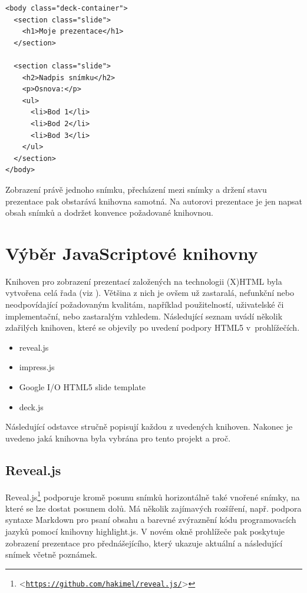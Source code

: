 \documentclass[11pt,twoside,a4paper]{book}
\let\oldUrl\url									%
\renewcommand\url[1]{<\texttt{\oldUrl{#1}}>}
\begin{document}
\begin{lstlisting}[caption=Ukázka zdrojového kódu HTML prezentace (deck.js)]
<body class="deck-container">
  <section class="slide">
    <h1>Moje prezentace</h1>
  </section>

  <section class="slide">
    <h2>Nadpis snímku</h2>
    <p>Osnova:</p>
    <ul>
      <li>Bod 1</li>
      <li>Bod 2</li>
      <li>Bod 3</li>
    </ul>
  </section>
</body>
\end{lstlisting}

Zobrazení právě jednoho snímku, přecházení mezi snímky a držení stavu prezentace pak obstarává knihovna samotná. Na autorovi prezentace je jen napsat obsah snímků a dodržet konvence požadované knihovnou.


\section{Výběr JavaScriptové knihovny}
Knihoven pro zobrazení prezentací založených na technologii (X)HTML byla vytvořena celá řada (viz \cite{htmlslideshowweb}). Většina z nich je ovšem už zastaralá, nefunkční nebo neodpovídající požadovaným kvalitám, například použitelností, uživatelské či implementační, nebo zastaralým vzhledem. Následující seznam uvádí několik zdařilých knihoven, které se objevily po uvedení podpory HTML5 v~prohlížečích.

\begin{itemize}
	\item reveal.js
	\item impress.js
	\item Google I/O HTML5 slide template
	\item deck.js
\end{itemize}

Následující odstavce stručně popisují každou z uvedených knihoven. Nakonec je uvedeno jaká knihovna byla vybrána pro tento projekt a proč.

\subsection{Reveal.js} \label{chap:revealjs}
Reveal.js\footnote{\url{https://github.com/hakimel/reveal.js/}} podporuje kromě posunu snímků horizontálně také vnořené snímky, na které se lze dostat posunem dolů. Má několik zajímavých rozšíření, např. podpora syntaxe Markdown pro psaní obsahu a barevné zvýraznění kódu programovacích jazyků pomocí knihovny highlight.js. V novém okně prohlížeče pak poskytuje zobrazení prezentace pro přednášejícího, který ukazuje aktuální a následující snímek včetně poznámek.
\end{document}
